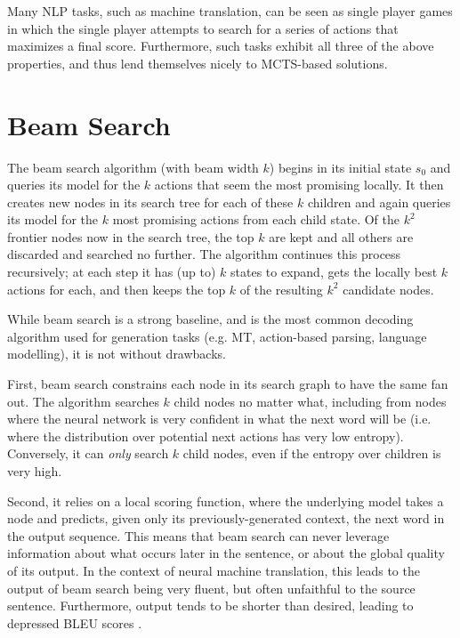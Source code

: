 \documentclass[11pt,a4paper]{article}
\begin{document}
Many NLP tasks, such as machine translation, can be seen as single player games in which
the single player attempts to search for a series of actions that maximizes a final score.
Furthermore, such tasks exhibit all three of the above properties, and thus lend themselves
nicely to MCTS-based solutions.

\section{Beam Search}
\label{sec:beam_search}
The beam search algorithm (with beam width $k$) begins in its initial state
$s_0$ and queries its model for the $k$ actions that seem the most promising
locally. It then creates new nodes in its search tree for each of these $k$
children and again queries its model for the $k$ most promising actions from
each child state. Of the $k^2$ frontier nodes now in the search tree, the top $k$
are kept and all others are discarded and searched no further. The algorithm
continues this process recursively; at each step it has (up to) $k$ states to
expand, gets the locally best $k$ actions for each, and then keeps the top $k$
of the resulting $k^2$ candidate nodes.

While beam search is a strong baseline, and is the most common decoding
algorithm used for generation tasks (e.g. MT, action-based parsing, language
modelling), it is not without drawbacks.

First, beam search constrains each node in its search graph to have the same
fan out. The algorithm searches $k$ child nodes no matter what, including from
nodes where the neural network is very confident in what the next word will be
(i.e. where the distribution over potential next actions has very low entropy).
Conversely, it can \emph{only} search $k$ child nodes, even if the entropy over
children is very high.

Second, it relies on a local scoring function, where the underlying model takes
a node and predicts, given only its previously-generated context, the next word
in the output sequence. This means that beam search can never leverage
information about what occurs later in the sentence, or about the global
quality of its output. In the context of neural machine translation, this leads
to the output of beam search being very fluent, but often unfaithful to the
source sentence. Furthermore, output tends to be shorter than desired, leading
to depressed BLEU scores \cite{koehn2017six}.
\end{document}
